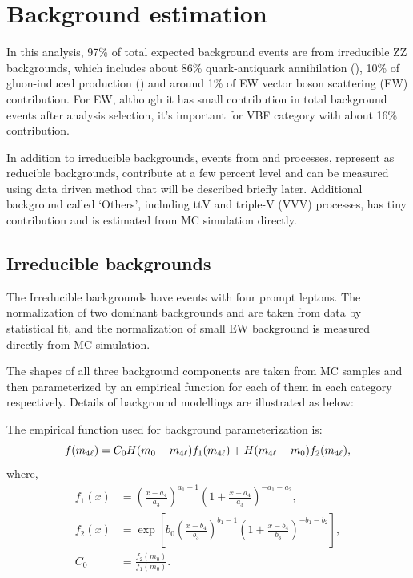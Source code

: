 \section{Background estimation}
\label{sec:hmhzz_bkg}

In this analysis, 97\% of total expected background events are from irreducible ZZ backgrounds, which includes about 86\% quark-antiquark annihilation (\qqZZ), 10\% of gluon-induced production (\ggZZ) and around 1\% of EW vector boson scattering (\qqZZ EW) contribution.
For \qqZZ EW, although it has small contribution in total background events after analysis selection, it's important for VBF category with about 16\% contribution.

In addition to irreducible backgrounds, events from \Zjet and \ttbar processes, represent as reducible backgrounds, contribute at a few percent level and can be measured using data driven method that will be described briefly later.
Additional background called `Others', including ttV and triple-V (VVV) processes, has tiny contribution and is estimated from MC simulation directly.

\subsection{Irreducible backgrounds}
The Irreducible backgrounds have events with four prompt leptons.
The normalization of two dominant backgrounds \qqZZ and \ggZZ are taken from data by statistical fit, and the normalization of small \qqZZ EW background is measured directly from MC simulation.

The \mfl shapes of all three background components are taken from MC samples and then parameterized by an empirical function for each of them in each category respectively.
Details of background modellings are illustrated as below:

The empirical function used for background parameterization is:
\begin{equation}
    f(m_{4\ell}) = C_0 H(m_{0} - m_{4\ell}) f_{1}(m_{4\ell}) + H(m_{4\ell} - m_{0}) f_{2}(m_{4\ell}),
    \label{eq:bkg_model}
\end{equation}
where,
\begin{align*}
    f_1(x) &= \left( \frac{x - a_4}{a_3} \right)^{a_1 - 1} \left( 1 + \frac{x - a_4}{a_3} \right)^{-a_1 - a_2}, \\
    f_2(x) &= \exp \left[ b_0 \left( \frac{x - b_4}{b_3} \right)^{b_1 - 1} \left( 1 + \frac{x - b_4}{b_3} \right)^{-b_1 - b_2} \right], \\
    C_0    &= \frac{f_{2} (m_0)} {f_{1} (m_0)}.
    \label{eq:bkg_model_full}
\end{align*}

